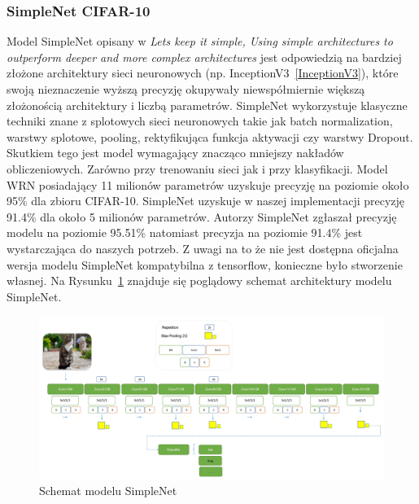 \documentclass[
    left=2.5cm,         %
    right=2.5cm,        %
    top=2.5cm,          %
    bottom=3cm,         %
    bindingoffset=6mm,  %
    nohyphenation=false %
]{eiti/eiti-thesis}
\begin{document}
        \subsubsection{SimpleNet CIFAR-10}\label{SimpleNetCIFAR-10}
        Model SimpleNet opisany w
        \textit{Lets keep it simple, Using simple architectures to outperform deeper and more complex architectures}\cite{DBLP:journals/corr/HasanPourRVS16}
        jest odpowiedzią na bardziej złożone
        architektury sieci neuronowych (np. InceptionV3~\ref{InceptionV3}), które swoją nieznaczenie wyższą precyzję
        okupywały niewspółmiernie większą złożonością architektury i liczbą parametrów. SimpleNet wykorzystuje klasyczne
        techniki znane z splotowych sieci neuronowych takie jak batch normalization, warstwy splotowe, pooling,
        rektyfikująca funkcja aktywacji czy warstwy Dropout. Skutkiem tego jest model wymagający znacząco mniejszy nakładów
        obliczeniowych. Zarówno przy trenowaniu sieci jak i przy klasyfikacji. Model WRN\cite{DBLP:journals/corr/ZagoruykoK16}
        posiadający 11 milionów parametrów uzyskuje precyzję na poziomie około 95\% dla zbioru CIFAR-10.
        SimpleNet uzyskuje w naszej implementacji precyzję 91.4\% dla około 5 milionów parametrów.
        Autorzy SimpleNet zgłaszał precyzję modelu na poziomie 95.51\% natomiast precyzja na poziomie 91.4\% jest wystarczająca do naszych potrzeb.
        Z uwagi na to że nie jest dostępna oficjalna wersja modelu SimpleNet kompatybilna z tensorflow, konieczne było stworzenie własnej.
        Na Rysunku~\ref{fig:simplenet_cifar10} znajduje się poglądowy schemat architektury modelu SimpleNet.
        \begin{figure}[H]
            \centring
            \includegraphics[width=\textwidth]{eiti/simplenet_overview.jpg}
            \caption{Schemat modelu SimpleNet\cite{DBLP:journals/corr/HasanPourRVS16}}
            \label{fig:simplenet_cifar10}
        \end{figure}
\end{document}
